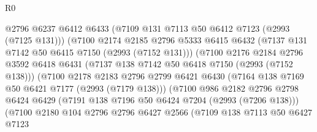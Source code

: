 \begin{lexlean}{R0}
\begin{coremodule}
                                    @2796
                                    @6237
                                    @6412
                                    @6433
                                    (@7109 @131 @7113 @50 @6412 @7123 (@2993 (@7125 @131)))
                                    (@7100
                                      @2174
                                      @2185
                                      @2796
                                      @5333
                                      @6415
                                      @6432
                                      (@7137 @131 @7142 @50 @6415 @7150 (@2993 (@7152 @131)))
                                      (@7100
                                        @2176
                                        @2184
                                        @2796
                                        @3592
                                        @6418
                                        @6431
                                        (@7137 @138 @7142 @50 @6418 @7150 (@2993 (@7152 @138)))
                                        (@7100
                                          @2178
                                          @2183
                                          @2796
                                          @2799
                                          @6421
                                          @6430
                                          (@7164 @138 @7169 @50 @6421 @7177 (@2993 (@7179 @138)))
                                          (@7100
                                            @986
                                            @2182
                                            @2796
                                            @2798
                                            @6424
                                            @6429
                                            (@7191 @138 @7196 @50 @6424 @7204 (@2993 (@7206 @138)))
                                            (@7100
                                              @2180
                                              @104
                                              @2796
                                              @2796
                                              @6427
                                              @2566
                                              (@7109
                                                @138
                                                @7113
                                                @50
                                                @6427
                                                @7123

\end{coremodule}
\end{lexlean}
